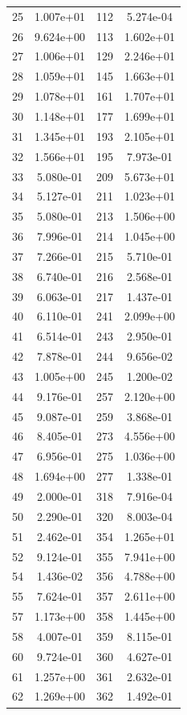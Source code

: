 \documentclass[12pt]{article}
\begin{document}
\begin{longtable}{@{}cccc@{}}
25 & 1.007e+01 & 112 & 5.274e-04 \\
26 & 9.624e+00 & 113 & 1.602e+01 \\
27 & 1.006e+01 & 129 & 2.246e+01 \\
28 & 1.059e+01 & 145 & 1.663e+01 \\
29 & 1.078e+01 & 161 & 1.707e+01 \\
30 & 1.148e+01 & 177 & 1.699e+01 \\
31 & 1.345e+01 & 193 & 2.105e+01 \\
32 & 1.566e+01 & 195 & 7.973e-01 \\
33 & 5.080e-01 & 209 & 5.673e+01 \\
34 & 5.127e-01 & 211 & 1.023e+01 \\
35 & 5.080e-01 & 213 & 1.506e+00 \\
36 & 7.996e-01 & 214 & 1.045e+00 \\
37 & 7.266e-01 & 215 & 5.710e-01 \\
38 & 6.740e-01 & 216 & 2.568e-01 \\
39 & 6.063e-01 & 217 & 1.437e-01 \\
40 & 6.110e-01 & 241 & 2.099e+00 \\
41 & 6.514e-01 & 243 & 2.950e-01 \\
42 & 7.878e-01 & 244 & 9.656e-02 \\
43 & 1.005e+00 & 245 & 1.200e-02 \\
44 & 9.176e-01 & 257 & 2.120e+00 \\
45 & 9.087e-01 & 259 & 3.868e-01 \\
46 & 8.405e-01 & 273 & 4.556e+00 \\
47 & 6.956e-01 & 275 & 1.036e+00 \\
48 & 1.694e+00 & 277 & 1.338e-01 \\
49 & 2.000e-01 & 318 & 7.916e-04 \\
50 & 2.290e-01 & 320 & 8.003e-04 \\
51 & 2.462e-01 & 354 & 1.265e+01 \\
52 & 9.124e-01 & 355 & 7.941e+00 \\
54 & 1.436e-02 & 356 & 4.788e+00 \\
55 & 7.624e-01 & 357 & 2.611e+00 \\
57 & 1.173e+00 & 358 & 1.445e+00 \\
58 & 4.007e-01 & 359 & 8.115e-01 \\
60 & 9.724e-01 & 360 & 4.627e-01 \\
61 & 1.257e+00 & 361 & 2.632e-01 \\
62 & 1.269e+00 & 362 & 1.492e-01 \\

\end{longtable}
\end{document}
